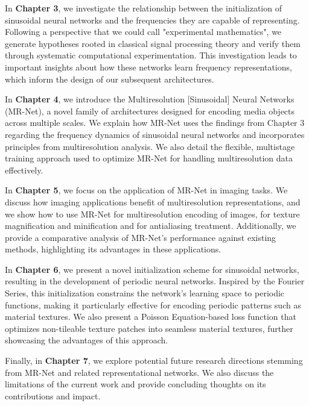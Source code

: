 In \textbf{Chapter 3}, we investigate the relationship between the initialization of sinusoidal neural networks and the frequencies they are capable of representing. Following a perspective that we could call "experimental mathematics", we generate hypotheses rooted in classical signal processing theory and verify them through systematic computational experimentation. This investigation leads to important insights about how these networks learn frequency representations, which inform the design of our subsequent architectures.


In \textbf{Chapter 4}, we introduce the Multiresolution [Sinusoidal] Neural Networks (MR-Net), a novel family of architectures designed for encoding media objects across multiple scales. We explain how MR-Net uses the findings from Chapter 3 regarding the frequency dynamics of sinusoidal neural networks and incorporates principles from multiresolution analysis. We also detail the flexible, multistage training approach used to optimize MR-Net for handling multiresolution data effectively.

In \textbf{Chapter 5}, we focus on the application of MR-Net in imaging tasks. We discuss how imaging applications benefit of multiresolution representations, and we show how to use MR-Net for multiresolution encoding of images, for texture magnification and minification and for antialiasing treatment. Additionally, we provide a comparative analysis of MR-Net's performance against existing methods, highlighting its advantages in these applications.

In \textbf{Chapter 6}, we present a novel initialization scheme for sinusoidal networks, resulting in the development of periodic neural networks. Inspired by the Fourier Series, this initialization constrains the network's learning space to periodic functions, making it particularly effective for encoding periodic patterns such as material textures. We also present a Poisson Equation-based loss function that optimizes non-tileable texture patches into seamless material textures, further showcasing the advantages of this approach.


Finally, in \textbf{Chapter 7}, we explore potential future research directions stemming from MR-Net and related representational networks. We also discuss the limitations of the current work and provide concluding thoughts on its contributions and impact.
